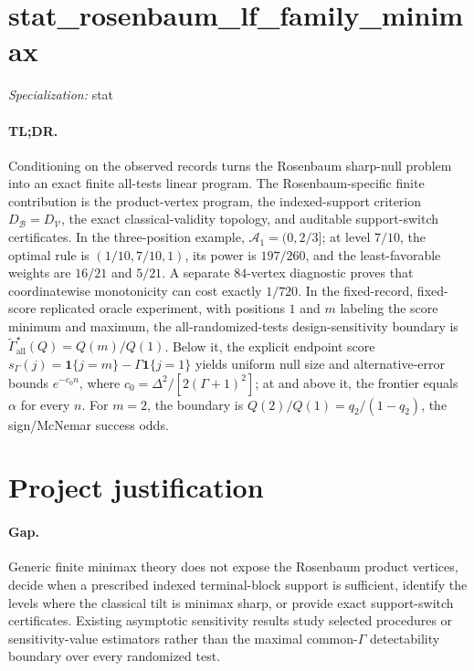\documentclass{article}
\begin{document}
\sloppy

\section*{stat\_\allowbreak{}rosenbaum\_\allowbreak{}lf\_\allowbreak{}family\_\allowbreak{}minimax}

\noindent\textit{Specialization:} stat\par

\paragraph{TL;DR.} Conditioning on the observed records turns the Rosenbaum sharp-null problem into an exact finite all-tests linear program. The Rosenbaum-specific finite contribution is the product-vertex program, the indexed-support criterion \(D_{\mathcal B}=D_{\mathcal V}\), the exact classical-validity topology, and auditable support-switch certificates. In the three-position example, \(\mathcal A_1=(0,2/3]\); at level \(7/10\), the optimal rule is \((1/10,7/10,1)\), its power is \(197/260\), and the least-favorable weights are \(16/21\) and \(5/21\). A separate \(84\)-vertex diagnostic proves that coordinatewise monotonicity can cost exactly \(1/720\). In the fixed-record, fixed-score replicated oracle experiment, with positions \(1\) and \(m\) labeling the score minimum and maximum, the all-randomized-tests design-sensitivity boundary is \(\widetilde\Gamma_{\mathrm{all}}^\star(Q)=Q(m)/Q(1)\). Below it, the explicit endpoint score \(s_\Gamma(j)=\mathbf1\{j=m\}-\Gamma\mathbf1\{j=1\}\) yields uniform null size and alternative-error bounds \(e^{-c_0n}\), where \(c_0=\Delta^2/[2(\Gamma+1)^2]\); at and above it, the frontier equals \(\alpha\) for every \(n\). For \(m=2\), the boundary is \(Q(2)/Q(1)=q_2/(1-q_2)\), the sign/McNemar success odds.

\section{Project justification}

\paragraph{Gap.} Generic finite minimax theory does not expose the Rosenbaum product vertices, decide when a prescribed indexed terminal-block support is sufficient, identify the levels where the classical tilt is minimax sharp, or provide exact support-switch certificates. Existing asymptotic sensitivity results study selected procedures or sensitivity-value estimators rather than the maximal common-\(\Gamma\) detectability boundary over every randomized test.
\end{document}
